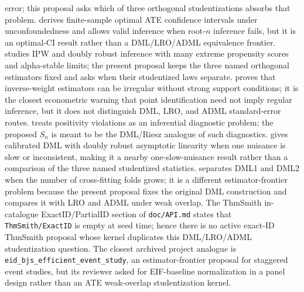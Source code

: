 \documentclass[11pt]{article}
\theoremstyle{definition}
\theoremstyle{plain}
\theoremstyle{remark}
\begin{document}
error; this proposal asks which of three orthogonal studentizations absorbs
that problem.
\citet{ArmstrongKolesar2021ATE} derives finite-sample optimal ATE confidence
intervals under unconfoundedness and allows valid inference when root-\(n\)
inference fails, but it is an optimal-CI result rather than a DML/LRO/ADML
equivalence frontier.
\citet{HeilerKazak2021ExtremePS} studies IPW and doubly robust inference with
many extreme propensity scores and alpha-stable limits; the present proposal
keeps the three named orthogonal estimators fixed and asks when their
studentized laws separate.
\citet{KhanTamer2010Irregular} proves that inverse-weight estimators can be
irregular without strong support conditions; it is the closest econometric
warning that point identification need not imply regular inference, but it does
not distinguish DML, LRO, and ADML standard-error routes.
\citet{PetersenPorterGruberWangVanDerLaan2012Positivity} treats positivity
violations as an inferential diagnostic problem; the proposed \(S_n\) is meant
to be the DML/Riesz analogue of such diagnostics.
\citet{VanDerLaanLuedtkeCarone2024CDML} gives calibrated DML with doubly robust
asymptotic linearity when one nuisance is slow or inconsistent, making it a
nearby one-slow-nuisance result rather than a comparison of the three named
studentized statistics.
\citet{Velez2024DML} separates DML1 and DML2 when the number of cross-fitting
folds grows; it is a different estimator-frontier problem because the present
proposal fixes the original DML construction and compares it with LRO and
ADML under weak overlap.
The ThmSmith in-catalogue ExactID/PartialID section of \texttt{doc/API.md}
states that \texttt{ThmSmith/ExactID} is empty at seed time; hence there is no
active exact-ID ThmSmith proposal whose kernel duplicates this DML/LRO/ADML
studentization question.  The closest archived project analogue is
\texttt{eid\_bjs\_efficient\_event\_study}, an estimator-frontier proposal for
staggered event studies, but its reviewer asked for EIF-baseline
normalization in a panel design rather than an ATE weak-overlap
studentization kernel.
\end{document}
